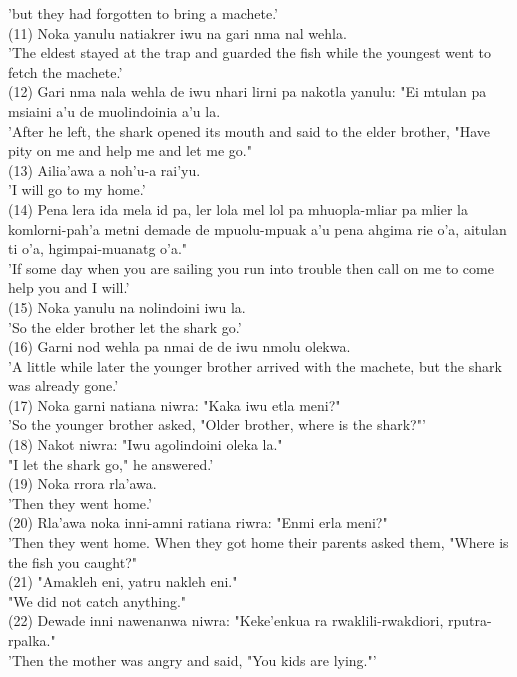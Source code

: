 \documentclass[10pt]{article}
\begin{document}
'but they had forgotten to bring a machete.'\\
(11) Noka yanulu natiakrer iwu na gari nma nal wehla.\\
'The eldest stayed at the trap and guarded the fish while the youngest went to fetch the machete.'\\
(12) Gari nma nala wehla de iwu nhari lirni pa nakotla yanulu: "Ei mtulan pa msiaini a'u de muolindoinia a'u la.\\
'After he left, the shark opened its mouth and said to the elder brother, "Have pity on me and help me and let me go."\\
(13) Ailia'awa a noh'u-a rai'yu.\\
'I will go to my home.'\\
(14) Pena lera ida mela id pa, ler lola mel lol pa mhuopla-mliar pa mlier la komlorni-pah'a metni demade de mpuolu-mpuak a'u pena ahgima rie o'a, aitulan ti o'a, hgimpai-muanatg o'a."\\
'If some day when you are sailing you run into trouble then call on me to come help you and I will.'\\
(15) Noka yanulu na nolindoini iwu la.\\
'So the elder brother let the shark go.'\\
(16) Garni nod wehla pa nmai de de iwu nmolu olekwa.\\
'A little while later the younger brother arrived with the machete, but the shark was already gone.'\\
(17) Noka garni natiana niwra: "Kaka iwu etla meni?"\\
'So the younger brother asked, "Older brother, where is the shark?"'\\
(18) Nakot niwra: "Iwu agolindoini oleka la."\\
"I let the shark go," he answered.'\\
(19) Noka rrora rla'awa.\\
'Then they went home.'\\
(20) Rla'awa noka inni-amni ratiana riwra: "Enmi erla meni?"\\
'Then they went home. When they got home their parents asked them, "Where is the fish you caught?"\\
(21) "Amakleh eni, yatru nakleh eni."\\
"We did not catch anything."\\
(22) Dewade inni nawenanwa niwra: "Keke'enkua ra rwaklili-rwakdiori, rputra-rpalka."\\
'Then the mother was angry and said, "You kids are lying."'\\
\end{document}
